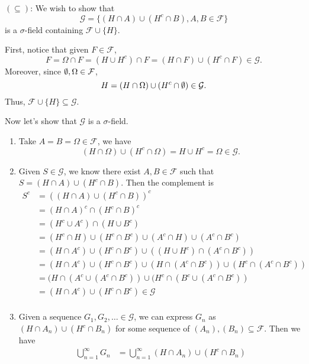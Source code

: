 \documentclass[12pt]{article}
\begin{document}
\begin{problem}[2]
$ ( \subseteq )$: We wish to show that 
\[
	\mathcal{G} = \{(H \cap A) \cup (H^{c} \cap B), A,B \in \mathcal{F}\} 
\]
is a $\sigma$-field containing $ \mathcal{F} \cup \{H\} $.


First, notice that given $ F \in \mathcal{F}$, \[ F = \Omega \cap F= (H \cup H^{c}) \cap F= (H \cap F) \cup (H^{c} \cap F)  \in \mathcal{G}.\] Moreover, since $ \emptyset, \Omega \in \mathcal{F}$, \[H = (H \cap \Omega) \cup (H^{c} \cap \emptyset) \in \mathcal{G}.\] Thus, $ \mathcal{F} \cup \{H\} \subseteq \mathcal{G}$.  

Now let's show that $ \mathcal{G}$ is a $\sigma$-field.
\begin{enumerate}[label=(\roman*)]
	\item Take $ A=B=\Omega \in \mathcal{F}$, we have
		\[
			(H \cap \Omega) \cup (H^{c} \cap \Omega) = H \cup H^{c} = \Omega \in \mathcal{G}
		.\] 
	\item Given $ S \in \mathcal{G}$, we know there exist $ A,B \in \mathcal{F}$ such that $ S=(H \cap A) \cup (H^{c} \cap B)$. Then the complement is
		\begin{align*}
			S^{c} &= ((H \cap A) \cup (H^{c} \cap B) )^{c}\\
			      &= (H \cap A)^{c} \cap (H^{c} \cap B)^{c}\\
			      &= (H^{c} \cup A^{c}) \cap (H \cup B^{c}) \\
			      &= (H^{c} \cap H) \cup (H^{c} \cap B^{c}) \cup (A^{c} \cap H) \cup (A^{c} \cap B^{c}) \\
			      &= (H \cap A^{c}) \cup (H^{c} \cap B^{c}) \cup ((H \cup H^{c}) \cap  (A^{c} \cap B^{c}))   \\
			      &=  (H \cap A^{c}) \cup (H^{c} \cap B^{c}) \cup (H \cap (A^{c} \cap B^{c} )) \cup (H^{c} \cap (A^{c} \cap B^{c}))  \\
			      &= (H \cap (A^{c} \cup (A^{c} \cap B^{c})) \cup (H^{c} \cap (B^{c} \cup (A^{c} \cap B^{c})) \\
			      &= (H \cap A^{c}) \cup (H^{c} \cap B^{c}) \in \mathcal{G}\\
		\end{align*}
	\item Given a sequence $ G_1,G_2,\ldots \in \mathcal{G}$, we can express $ G_n$ as $ (H \cap A_n) \cup (H^{c} \cap B_n)$ for some sequence of $ (A_n),(B_n) \subseteq \mathcal{F}$. Then we have
		\begin{align*}
			\bigcup_{ n =1}^{\infty} G_n &= \bigcup_{ n =1}^{\infty} (H \cap A_n) \cup (H^{c} \cap B_n) \\

\end{align*}
\end{enumerate}
\end{problem}
\end{document}
